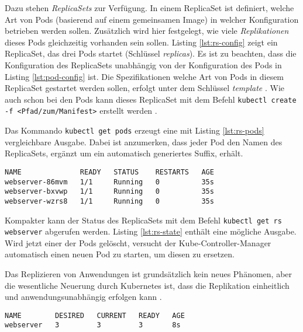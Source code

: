 \documentclass[11pt,a4paper]{article}
\begin{document}
Dazu stehen \emph{ReplicaSets} zur Verfügung.
In einem ReplicaSet ist definiert, welche Art von Pods (basierend auf einem gemeinsamen Image)
in welcher Konfiguration betrieben werden sollen. Zusätzlich wird hier festgelegt, wie viele \emph{Replikationen}
dieses Pods gleichzeitig vorhanden sein sollen.
Listing \ref{lst:rs-config} zeigt ein ReplicaSet, das drei Pods startet (Schlüssel \emph{replicas}).
Es ist zu beachten, dass die Konfiguration des ReplicaSets unabhängig von der Konfiguration
des Pods in Listing \ref{lst:pod-config} ist.
Die Spezifikationen welche Art von Pods in diesem ReplicaSet gestartet werden sollen,
erfolgt unter dem Schlüssel \emph{template} \cite{Schmeling_Dargatz_2022}.
Wie auch schon bei den Pods kann dieses ReplicaSet mit dem Befehl
\lstinline|kubectl create -f <Pfad/zum/Manifest>| erstellt werden \cite{Schmeling_Dargatz_2022}.



Das Kommando \lstinline|kubectl get pods| erzeugt eine mit Listing \ref{lst:rs-pods}
vergleichbare Ausgabe. Dabei ist anzumerken, dass jeder Pod den Namen des ReplicaSets,
ergänzt um ein automatisch generiertes Suffix, erhält.

\begin{lstlisting}[caption={Drei Pods wurden erfolgreich gestartet.}, label={lst:rs-pods}]
NAME              READY   STATUS    RESTARTS   AGE
webserver-86mvm   1/1     Running   0          35s
webserver-bxvwp   1/1     Running   0          35s
webserver-wzrs8   1/1     Running   0          35s
\end{lstlisting}

Kompakter kann der Status des ReplicaSets mit dem Befehl \lstinline|kubectl get rs webserver|
abgerufen werden. Listing \ref{lst:rs-state} enthält eine mögliche Ausgabe.
Wird jetzt einer der Pods gelöscht, versucht der Kube-Controller-Manager automatisch
einen neuen Pod zu starten, um diesen zu ersetzen.

Das Replizieren von Anwendungen ist grundsätzlich kein neues Phänomen, aber
die wesentliche Neuerung durch Kubernetes ist, dass die Replikation einheitlich
und anwendungsunabhängig erfolgen kann \cite{Schmeling_Dargatz_2022}.

\begin{lstlisting}[caption={Ein ReplicaSet mit drei erfolgreich gestarteten Instanze.}, label={lst:rs-state}]
NAME        DESIRED   CURRENT   READY   AGE
webserver   3         3         3       8s
\end{lstlisting}
\end{document}
